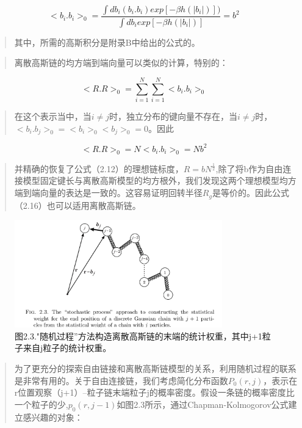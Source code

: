 \documentclass{article}
\begin{document}
\begin{sloppypar}
\begin{CJK}{UTF8}{gkai}
\begin{equation}
			<b_{i}.b_{i}>_{0}= \frac{\int db_{i}(b_{i}.b_{i})exp[-\beta h(|b_{i}|)])}{\int db_{i}exp[-\beta h(|b_{i}|)]}=b^2
			\end{equation}
			\begin{quotation}
				其中，所需的高斯积分是附录B中给出的公式的。
			\end{quotation}
			\begin{quotation}
				离散高斯链的均方端到端向量可以类似的计算，特别的：
			\end{quotation}
			\begin{equation}
			<R.R>_{0}=\sum_{i=1}^{N}\sum_{i=1}^{N}<b_{i}.b_{i}>_{0}
			\end{equation}
			\begin{quotation}
				在这个表示当中，当$i\neq j$时，独立分布的键向量不存在，当$i\neq j$时，$<b_{i}.b_{j}>_{0}=<b_{i}>_{0}<b_{j}>_{0}=0$。因此
			\end{quotation}
			\begin{equation}
			<R.R>_{0}=N<b_{i}.b_{i}>_{0}=Nb^2
			\end{equation}
			\begin{quotation}
				并精确的恢复了公式（2.12）的理想链标度，$R=bN^\frac{1}{2}$,除了将b作为自由连接模型固定键长与离散高斯模型的均方根外，我们发现这两个理想模型均方端到端向量的表达是一致的。这容易证明回转半径$R_{g}$是等价的。因此公式（2.16）也可以适用离散高斯链。
			\end{quotation}
			\begin{figure}
				\caption{图2.3."随机过程”方法构造离散高斯链的末端的统计权重，其中j+1粒子来自j粒子的统计权重。}
				\centering
				\includegraphics[width=9cm]{1.png}
			\end{figure}
			\newpage
			\begin{quotation}
				为了更充分的探索自由链接和离散高斯链模型的关系，利用随机过程的联系是非常有用的。关于自由连接链，我们考虑简化分布函数$P_{0}(r,j)$，表示在r位置观察（j+1）--粒子链末端粒子j的概率密度。假设一条链的概率密度比一个粒子的少,$p_{0}(r,j-1)$如图2.3所示，通过Chapman-Kolmogorov公式建立感兴趣的对象：
			\end{quotation}

\end{CJK}
\end{sloppypar}
\end{document}
